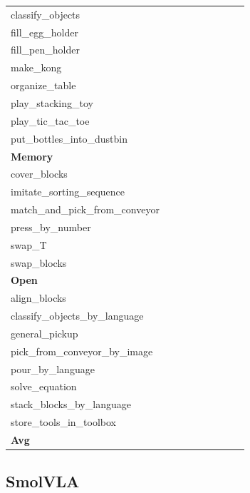 \begin{table}[H]
{\begin{tabular}{l|c|c|c|c|c|c|c|c}
classify\_objects &  &  &  &  &  &  &  &  \\
fill\_egg\_holder &  &  &  &  &  &  &  &  \\
fill\_pen\_holder &  &  &  &  &  &  &  &  \\
make\_kong &  &  &  &  &  &  &  &  \\
organize\_table &  &  &  &  &  &  &  &  \\
play\_stacking\_toy &  &  &  &  &  &  &  &  \\
play\_tic\_tac\_toe &  &  &  &  &  &  &  &  \\
put\_bottles\_into\_dustbin &  &  &  &  &  &  &  &  \\
\hline
\multicolumn{9}{l}{\textbf{Memory}} \\
cover\_blocks &  &  &  &  &  &  &  &  \\
imitate\_sorting\_sequence &  &  &  &  &  &  &  &  \\
match\_and\_pick\_from\_conveyor &  &  &  &  &  &  &  &  \\
press\_by\_number &  &  &  &  &  &  &  &  \\
swap\_T &  &  &  &  &  &  &  &  \\
swap\_blocks &  &  &  &  &  &  &  &  \\
\hline
\multicolumn{9}{l}{\textbf{Open}} \\
align\_blocks &  &  &  &  &  &  &  &  \\
classify\_objects\_by\_language &  &  &  &  &  &  &  &  \\
general\_pickup &  &  &  &  &  &  &  &  \\
pick\_from\_conveyor\_by\_image &  &  &  &  &  &  &  &  \\
pour\_by\_language &  &  &  &  &  &  &  &  \\
solve\_equation &  &  &  &  &  &  &  &  \\
stack\_blocks\_by\_language &  &  &  &  &  &  &  &  \\
store\_tools\_in\_toolbox &  &  &  &  &  &  &  &  \\
\hline
\textbf{Avg} &  &  &  &  &  &  &  &  \\
\hline
\end{tabular}
}
\end{table}
\subsection{SmolVLA}
\label{part:smolvla}

